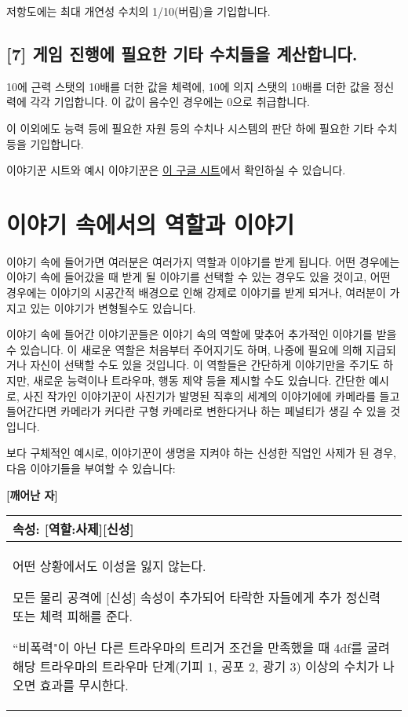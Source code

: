 \documentclass[12pt]{report}
\newenvironment{story}[2]
{\begin{center}
		{\large \textbf{[#1]}}\\[1ex]
		\begin{tabular}{|p{\textwidth}|}
			\hline
			\textbf{속성}: #2
			\\
			\hline
		}
		{ 
			\\\hline
		\end{tabular}
	\end{center}
}
\newcommand{\world}[1]{{\nanumpen \large #1 \par}\bigskip}
\begin{document}
	저항도에는 최대 개연성 수치의 1/10(버림)을 기입합니다.
	
	\section*{[7] 게임 진행에 필요한 기타 수치들을 계산합니다.}
	10에 근력 스탯의 10배를 더한 값을 체력에, 10에 의지 스탯의 10배를 더한 값을 정신력에 각각 기입합니다. 이 값이 음수인 경우에는 0으로 취급합니다.
	
	이 이외에도 능력 등에 필요한 자원 등의 수치나 시스템의 판단 하에 필요한 기타 수치 등을 기입합니다.

	\bigskip

	이야기꾼 시트와 예시 이야기꾼은 \href{https://docs.google.com/spreadsheets/d/1g3ZO-oALMVbytbE2tvSBdT6czxB32XHZ1crWIGavEhQ/edit?usp=sharing}{이 구글 시트}에서 확인하실 수 있습니다.
	
	\chapter{이야기 속에서의 역할과 이야기}
	\world{이야기 속에 들어가면 여러분은 여러가지 역할과 이야기를 받게 됩니다. 어떤 경우에는 이야기 속에 들어갔을 때 받게 될 이야기를 선택할 수 있는 경우도 있을 것이고, 어떤 경우에는 이야기의 시공간적 배경으로 인해 강제로 이야기를 받게 되거나, 여러분이 가지고 있는 이야기가 변형될수도 있습니다.}
	
	이야기 속에 들어간 이야기꾼들은 이야기 속의 역할에 맞추어 추가적인 이야기를 받을 수 있습니다. 이 새로운 역할은 처음부터 주어지기도 하며, 나중에 필요에 의해 지급되거나 자신이 선택할 수도 있을 것입니다. 이 역할들은 간단하게 이야기만을 주기도 하지만, 새로운 능력이나 트라우마, 행동 제약 등을 제시할 수도 있습니다. 간단한 예시로, 사진 작가인 이야기꾼이 사진기가 발명된 직후의 세계의 이야기에에 카메라를 들고 들어간다면 카메라가 커다란 구형 카메라로 변한다거나 하는 페널티가 생길 수 있을 것입니다.

	\bigskip

	보다 구체적인 예시로, 이야기꾼이 생명을 지켜야 하는 신성한 직업인 사제가 된 경우, 다음 이야기들을 부여할 수 있습니다:
	
	\begin{story}{깨어난 자}{[역할:사제][신성]}
		어떤 상황에서도 이성을 잃지 않는다.
		
		모든 물리 공격에 [신성] 속성이 추가되어 타락한 자들에게 추가 정신력 또는 체력 피해를 준다.
		
		“비폭력"이 아닌 다른 트라우마의 트리거 조건을 만족했을 때 4df를 굴려 해당 트라우마의 트라우마 단계(기피 1, 공포 2, 광기 3) 이상의 수치가 나오면 효과를 무시한다.
	\end{story}
	
\end{document}
